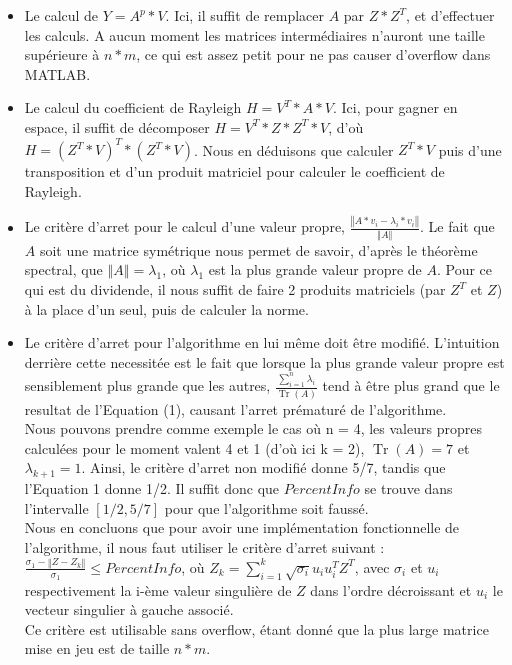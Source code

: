 \documentclass[a4paper,12pt]{article}
\DeclareMathOperator{\Tr}{Tr}
\newcommand{\norme}[1]{\left\Vert #1\right\Vert}
\begin{document}
        \begin{itemize}
            \item Le calcul de $Y = A^p*V$. Ici, il suffit de remplacer $A$ par $Z*Z^T$, et d'effectuer les calculs. A aucun moment les matrices intermédiaires n'auront une taille supérieure à $n*m$, ce qui est assez petit pour ne pas causer d'overflow dans MATLAB.
            \item Le calcul du coefficient de Rayleigh $H = V^T*A*V$. Ici, pour gagner en espace, il suffit de décomposer $H = V^T*Z*Z^T*V$, d'où $H = (Z^T*V)^T*(Z^T*V)$. Nous en déduisons que calculer $Z^T*V$ puis d'une transposition et d'un produit matriciel pour calculer le coefficient de Rayleigh.
            \item Le critère d'arret pour le calcul d'une valeur propre, $\frac{\norme{A*v_i - \lambda_i*v_i}}{\norme{A}}$. Le fait que $A$ soit une matrice symétrique nous permet de savoir, d'après le théorème spectral, que $\norme{A} = \lambda_1$, où $\lambda_1$ est la plus grande valeur propre de $A$. Pour ce qui est du dividende, il nous suffit de faire 2 produits matriciels (par $Z^T$ et $Z$) à la place d'un seul, puis de calculer la norme.
            \item Le critère d'arret pour l'algorithme en lui même doit être modifié. L'intuition derrière cette necessitée est le fait que lorsque la plus grande valeur propre est sensiblement plus grande que les autres, $\frac{\sum\limits_{i=1}^n \lambda_i}{\Tr(A)}$ tend à être plus grand que le resultat de l'Equation (1), causant l'arret prématuré de l'algorithme. \\
            Nous pouvons prendre comme exemple le cas où n = 4, les valeurs propres calculées pour le moment valent 4 et 1 (d'où ici k = 2), $\Tr(A) = 7$ et $\lambda_{k+1} = 1$. Ainsi, le critère d'arret non modifié donne 5/7, tandis que l'Equation 1 donne 1/2. Il suffit donc que $PercentInfo$ se trouve dans l'intervalle $[1/2,5/7]$ pour que l'algorithme soit faussé. \\
            Nous en concluons que pour avoir une implémentation fonctionnelle de l'algorithme, il nous faut utiliser le critère d'arret suivant : $\frac{\sigma_1 - \norme{Z - Z_k}}{\sigma_1} \leq PercentInfo$, où $Z_k = \sum\limits_{i=1}^k \sqrt{\sigma_i}u_iu_i^TZ^T$, avec $\sigma_i$ et $u_i$ respectivement la i-ème valeur singulière de $Z$ dans l'ordre décroissant et $u_i$ le vecteur singulier à gauche associé. \\
            Ce critère est utilisable sans overflow, étant donné que la plus large matrice mise en jeu est de taille $n*m$.
        \end{itemize}
\bigskip
\end{document}
